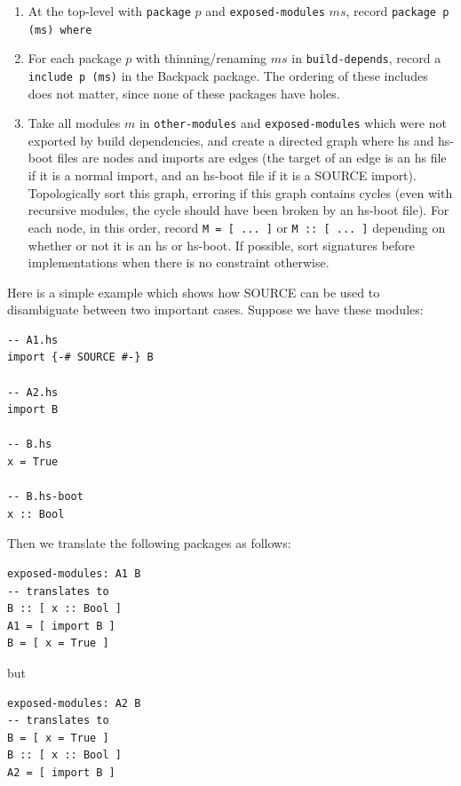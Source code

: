 \documentclass{article}
\begin{document}
\begin{enumerate}

    \item At the top-level with \verb|package| $p$ and
        \verb|exposed-modules| $ms$, record \verb|package p (ms) where|

    \item For each package $p$ with thinning/renaming $ms$ in
        \verb|build-depends|, record a \verb|include p (ms)| in the
        Backpack package.  The ordering of these includes does not
        matter, since none of these packages have holes.

    \item Take all modules $m$ in \verb|other-modules| and
        \verb|exposed-modules| which were not exported by build
        dependencies, and create a directed graph where hs and hs-boot
        files are nodes and imports are edges (the target of an edge is
        an hs file if it is a normal import, and an hs-boot file if it
        is a SOURCE import).  Topologically sort this graph, erroring if
        this graph contains cycles (even with recursive modules, the
        cycle should have been broken by an hs-boot file).  For each
        node, in this order, record \verb|M = [ ... ]| or \verb|M :: [ ... ]|
        depending on whether or not it is an hs or hs-boot.  If possible,
        sort signatures before implementations when there is no constraint
        otherwise.

\end{enumerate}

Here is a simple example which shows how SOURCE can be used to disambiguate
between two important cases. Suppose we have these modules:

\begin{verbatim}
-- A1.hs
import {-# SOURCE #-} B

-- A2.hs
import B

-- B.hs
x = True

-- B.hs-boot
x :: Bool
\end{verbatim}

Then we translate the following packages as follows:

\begin{verbatim}
exposed-modules: A1 B
-- translates to
B :: [ x :: Bool ]
A1 = [ import B ]
B = [ x = True ]
\end{verbatim}

but

\begin{verbatim}
exposed-modules: A2 B
-- translates to
B = [ x = True ]
B :: [ x :: Bool ]
A2 = [ import B ]
\end{verbatim}
\end{document}
